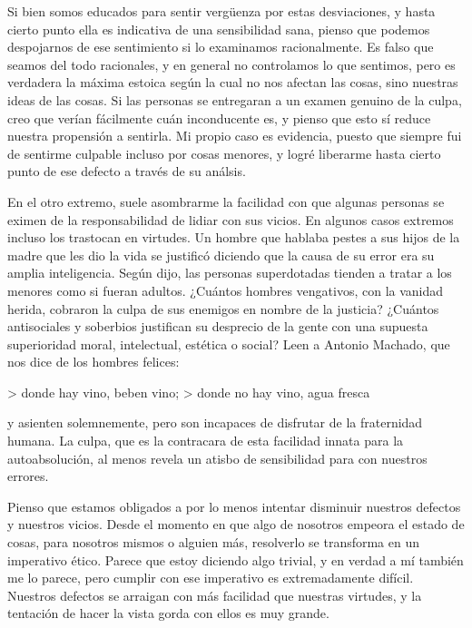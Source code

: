 \documentclass[a4paper, 12pt]{article}
\begin{document}
Si bien somos educados para sentir vergüenza por estas desviaciones, y hasta
cierto punto ella es indicativa de una sensibilidad sana, pienso que podemos
despojarnos de ese sentimiento si lo examinamos racionalmente. Es falso que
seamos del todo racionales, y en general no controlamos lo que sentimos, pero
es verdadera la máxima estoica según la cual no nos afectan las cosas, sino
nuestras ideas de las cosas. Si las personas se entregaran a un examen genuino
de la culpa, creo que verían fácilmente cuán inconducente es, y pienso que esto
sí reduce nuestra propensión a sentirla. Mi propio caso es evidencia, puesto
que siempre fui de sentirme culpable incluso por cosas menores, y logré
liberarme hasta cierto punto de ese defecto a través de su análsis.

En el otro extremo, suele asombrarme la facilidad con que algunas personas se eximen
de la responsabilidad de lidiar con sus vicios. En algunos casos extremos incluso los
trastocan en virtudes. Un hombre que hablaba pestes a sus hijos de la madre que
les dio la vida se justificó diciendo que la causa de su error era su amplia
inteligencia. Según dijo, las personas superdotadas tienden a tratar a los
menores como si fueran adultos. ¿Cuántos hombres vengativos, con la vanidad
herida, cobraron la culpa de sus enemigos en nombre de la justicia? ¿Cuántos 
antisociales y soberbios justifican su desprecio de la gente con una supuesta
superioridad moral, intelectual, estética o social? Leen a Antonio Machado, que 
nos dice de los hombres felices:

> donde hay vino, beben vino;
> donde no hay vino, agua fresca

y asienten solemnemente, pero son incapaces de disfrutar de la fraternidad
humana. La culpa, que es la contracara de esta facilidad innata para la
autoabsolución, al menos revela un atisbo de sensibilidad para con nuestros
errores.

Pienso que estamos obligados a por lo menos intentar disminuir nuestros
defectos y nuestros vicios. Desde el momento en que algo de nosotros empeora el
estado de cosas, para nosotros mismos o alguien más, resolverlo se transforma
en un imperativo ético. Parece que estoy diciendo algo trivial, y en verdad a
mí también me lo parece, pero cumplir con ese imperativo es extremadamente
difícil. Nuestros defectos se arraigan con más facilidad que nuestras virtudes,
y la tentación de hacer la vista gorda con ellos es muy grande.
\end{document}
